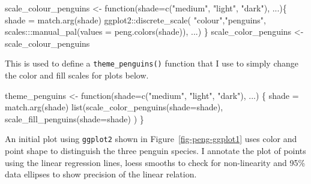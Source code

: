\documentclass[
  letterpaper,
  10pt,
  krantz2]{krantz}
\makeatletter
\newenvironment{Shaded}{\begin{snugshade}}{\end{snugshade}}
\newcommand{\AttributeTok}[1]{\textcolor[rgb]{0.40,0.45,0.13}{#1}}
\newcommand{\ControlFlowTok}[1]{\textcolor[rgb]{0.00,0.23,0.31}{#1}}
\newcommand{\FunctionTok}[1]{\textcolor[rgb]{0.28,0.35,0.67}{#1}}
\newcommand{\NormalTok}[1]{\textcolor[rgb]{0.00,0.23,0.31}{#1}}
\newcommand{\OtherTok}[1]{\textcolor[rgb]{0.00,0.23,0.31}{#1}}
\newcommand{\SpecialCharTok}[1]{\textcolor[rgb]{0.37,0.37,0.37}{#1}}
\newcommand{\StringTok}[1]{\textcolor[rgb]{0.13,0.47,0.30}{#1}}
\newenvironment{kframe}{%
  \medskip{}
  \setlength{\fboxsep}{.8em}
  \def\at@end@of@kframe{}%
  \ifinner\ifhmode%
  \def\at@end@of@kframe{\end{minipage}}%
  \begin{minipage}{\columnwidth}%
  \fi\fi%
  \def\FrameCommand##1{\hskip\@totalleftmargin \hskip-\fboxsep
  \colorbox{shadecolor}{##1}\hskip-\fboxsep
      \hskip-\linewidth \hskip-\@totalleftmargin \hskip\columnwidth}%
  \MakeFramed {\advance\hsize-\width
    \@totalleftmargin\z@ \linewidth\hsize
    \@setminipage}}%
{\par\unskip\endMakeFramed%
  \at@end@of@kframe}
\renewenvironment{Shaded}{\begin{kframe}}{\end{kframe}}
\makeatother
\begin{document}
\begin{Shaded}
\begin{Highlighting}[]
\NormalTok{scale\_colour\_penguins }\OtherTok{\textless{}{-}} \ControlFlowTok{function}\NormalTok{(}\AttributeTok{shade=}\FunctionTok{c}\NormalTok{(}\StringTok{"medium"}\NormalTok{, }\StringTok{"light"}\NormalTok{, }\StringTok{"dark"}\NormalTok{), ...)\{}
\NormalTok{  shade }\OtherTok{=} \FunctionTok{match.arg}\NormalTok{(shade)}
\NormalTok{  ggplot2}\SpecialCharTok{::}\FunctionTok{discrete\_scale}\NormalTok{(}
    \StringTok{"colour"}\NormalTok{,}\StringTok{"penguins"}\NormalTok{,}
\NormalTok{    scales}\SpecialCharTok{:::}\FunctionTok{manual\_pal}\NormalTok{(}\AttributeTok{values =} \FunctionTok{peng.colors}\NormalTok{(shade)), ...)}
\NormalTok{\}}
\NormalTok{scale\_color\_penguins }\OtherTok{\textless{}{-}}\NormalTok{ scale\_colour\_penguins}
\end{Highlighting}
\end{Shaded}

This is used to define a \texttt{theme\_penguins()} function that I use
to simply change the color and fill scales for plots below.

\begin{Shaded}
\begin{Highlighting}[]
\NormalTok{theme\_penguins }\OtherTok{\textless{}{-}} \ControlFlowTok{function}\NormalTok{(}\AttributeTok{shade=}\FunctionTok{c}\NormalTok{(}\StringTok{"medium"}\NormalTok{, }\StringTok{"light"}\NormalTok{, }\StringTok{"dark"}\NormalTok{), ...) \{}
\NormalTok{  shade }\OtherTok{=} \FunctionTok{match.arg}\NormalTok{(shade)}
  \FunctionTok{list}\NormalTok{(}\FunctionTok{scale\_color\_penguins}\NormalTok{(}\AttributeTok{shade=}\NormalTok{shade),}
       \FunctionTok{scale\_fill\_penguins}\NormalTok{(}\AttributeTok{shade=}\NormalTok{shade)}
\NormalTok{      )}
\NormalTok{\}}
\end{Highlighting}
\end{Shaded}

An initial plot using \texttt{ggplot2} shown in
Figure~\ref{fig-peng-ggplot1} uses color and point shape to distinguish
the three penguin species. I annotate the plot of points using the
linear regression lines, loess smooths to check for non-linearity and
95\% data ellipses to show precision of the linear relation.
\end{document}
